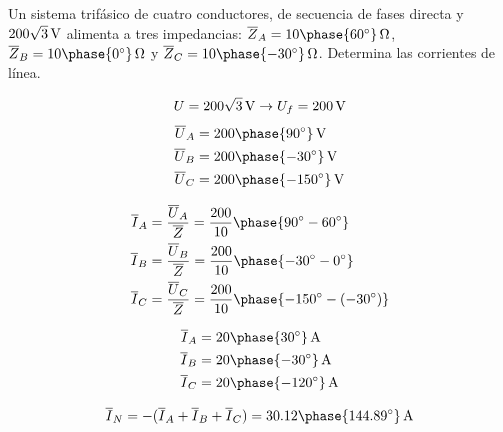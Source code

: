\documentclass[12pt]{article}
\begin{document}
 \clearpage
 
\section{}
Un sistema trifásico de cuatro conductores, de secuencia de fases
directa y $\SI[parse-numbers=false]{200\sqrt{3}}{\volt}$ alimenta a
tres impedancias:
$\overline{Z}_{A} =
\SI[parse-numbers=false]{10\phase{\ang{60}}}{\ohm}$,
$\overline{Z}_{B} = \SI[parse-numbers=false]{10\phase{\ang{0}}}{\ohm}$
y
$\overline{Z}_{C} =
\SI[parse-numbers=false]{10\phase{\ang{-30}}}{\ohm}$. Determina las
corrientes de línea.

\noindent\hrulefill

\[ U = \SI[parse-numbers=false]{200\sqrt{3}}{\volt} \rightarrow U_f =
  \SI{200}{\volt}
\]
\begin{align*}
  \overline{U}_A &= \SI[parse-numbers=false]{200\phase{\ang{90}}}{\volt}\\
  \overline{U}_B &= \SI[parse-numbers=false]{200\phase{\ang{-30}}}{\volt}\\
  \overline{U}_C &= \SI[parse-numbers=false]{200\phase{\ang{-150}}}{\volt}\\
\end{align*}

\begin{align*}
  \overline{I}_A &= \frac{\overline{U}_A}{\overline{Z}} = \frac{200}{10}\phase{\ang{90} - \ang{60}} \\
  \overline{I}_B &= \frac{\overline{U}_B}{\overline{Z}} = \frac{200}{10}\phase{\ang{-30} - \ang{0}}\\
  \overline{I}_C &= \frac{\overline{U}_C}{\overline{Z}} = \frac{200}{10}\phase{\ang{-150} - (\ang{-30})}
\end{align*}

 \begin{align*}
   \overline{I}_A &= \SI[parse-numbers=false]{20\phase{\ang{30}}}{\ampere}\\
   \overline{I}_B &= \SI[parse-numbers=false]{20\phase{\ang{-30}}}{\ampere}\\
   \overline{I}_C &= \SI[parse-numbers=false]{20\phase{\ang{-120}}}{\ampere}
 \end{align*}

 \[
   \overline{I}_N = -(\overline{I}_A + \overline{I}_B +
   \overline{I}_C) =
   \SI[parse-numbers=false]{30.12\phase{\ang{144.89}}}{\ampere}
 \]

 \clearpage
 
 \section{}
\end{document}
